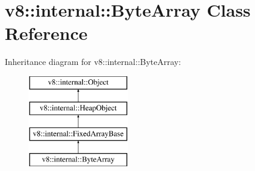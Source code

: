 \hypertarget{classv8_1_1internal_1_1_byte_array}{}\section{v8\+:\+:internal\+:\+:Byte\+Array Class Reference}
\label{classv8_1_1internal_1_1_byte_array}
Inheritance diagram for v8\+:\+:internal\+:\+:Byte\+Array\+:\begin{figure}[H]
\begin{center}
\leavevmode
\includegraphics[height=4.000000cm]{classv8_1_1internal_1_1_byte_array}
\end{center}
\end{figure}
